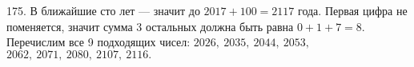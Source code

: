 175. В ближайшие сто лет --- значит до $2017+100=2117$ года. Первая цифра не поменяется, значит сумма 3 остальных должна быть равна $0+1+7=8.$ Перечислим все 9 подходящих чисел: $2026,\ 2035,\ 2044,\ 2053,$\\$2062,\ 2071,\ 2080,\ 2107,\ 2116.$\\
